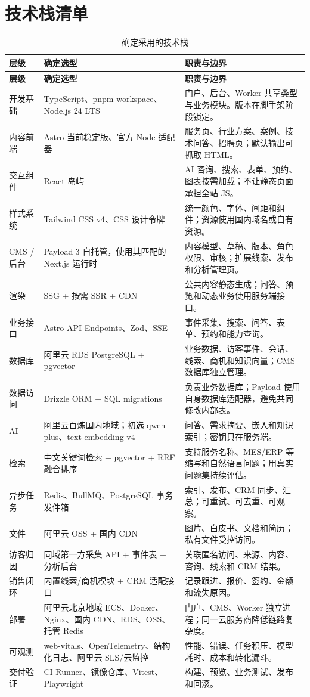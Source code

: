 \documentclass[UTF8,zihao=-4,a4paper]{ctexart}
\begin{document}
\section{技术栈清单}

\begin{longtable}{P{28mm}P{47mm}Y}
\caption{确定采用的技术栈}\\
\toprule
\textbf{层级} & \textbf{确定选型} & \textbf{职责与边界}\\
\midrule
\endfirsthead
\toprule
\textbf{层级} & \textbf{确定选型} & \textbf{职责与边界}\\
\midrule
\endhead
开发基础 & TypeScript、pnpm workspace、Node.js 24 LTS & 门户、后台、Worker 共享类型与业务模块。版本在脚手架阶段锁定。\\
内容前端 & Astro 当前稳定版、官方 Node 适配器 & 服务页、行业方案、案例、技术问答、招聘页；默认输出可抓取 HTML。\\
交互组件 & React 岛屿 & AI 咨询、搜索、表单、预约、图表按需加载；不让静态页面承担全站 JS。\\
样式系统 & Tailwind CSS v4、CSS 设计令牌 & 统一颜色、字体、间距和组件；资源使用国内域名或自有资源。\\
CMS / 后台 & Payload 3 自托管，使用其匹配的 Next.js 运行时 & 内容模型、草稿、版本、角色权限、审核；扩展线索、发布和分析管理页。\\
渲染 & SSG + 按需 SSR + CDN & 公共内容静态生成；问答、预览和动态业务使用服务端接口。\\
业务接口 & Astro API Endpoints、Zod、SSE & 事件采集、搜索、问答、表单、预约和能力查询。\\
数据库 & 阿里云 RDS PostgreSQL + pgvector & 业务数据、访客事件、会话、线索、商机和知识向量；CMS 数据库独立管理。\\
数据访问 & Drizzle ORM + SQL migrations & 负责业务数据库；Payload 使用自身数据库适配器，避免共同修改内部表。\\
AI & 阿里云百炼国内地域；初选 qwen-plus、text-embedding-v4 & 问答、需求摘要、嵌入和知识索引；密钥只在服务端。\\
检索 & 中文关键词检索 + pgvector + RRF 融合排序 & 支持服务名称、MES/ERP 等缩写和自然语言问题；用真实问题集持续评估。\\
异步任务 & Redis、BullMQ、PostgreSQL 事务发件箱 & 索引、发布、CRM 同步、汇总；可重试、可去重、可观察。\\
文件 & 阿里云 OSS + 国内 CDN & 图片、白皮书、文档和简历；私有文件受控访问。\\
访客归因 & 同域第一方采集 API + 事件表 + 分析后台 & 关联匿名访问、来源、内容、咨询、线索和 CRM 结果。\\
销售闭环 & 内置线索/商机模块 + CRM 适配接口 & 记录跟进、报价、签约、金额和流失原因。\\
部署 & 阿里云北京地域 ECS、Docker、Nginx、国内 CDN、RDS、OSS、托管 Redis & 门户、CMS、Worker 独立进程；同一云服务商降低链路复杂度。\\
可观测 & web-vitals、OpenTelemetry、结构化日志、阿里云 SLS/云监控 & 性能、错误、任务积压、模型耗时、成本和转化漏斗。\\
交付验证 & CI Runner、镜像仓库、Vitest、Playwright & 构建、预览、业务测试、发布和回滚。\\
\bottomrule
\end{longtable}
\end{document}
